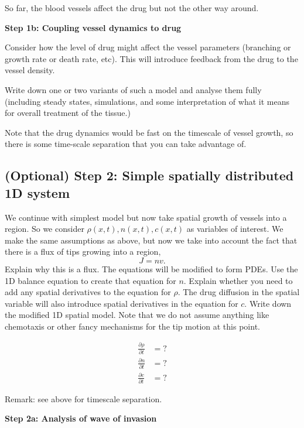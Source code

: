 So far, the blood vessels affect the drug but not the other way around.

\bigskip

\textbf{Step 1b: Coupling vessel dynamics to drug}

Consider how the level of drug might affect the vessel parameters (branching or growth rate or death rate, etc). This will introduce feedback from the drug to the vessel density.

Write down one or two variants of such a model and analyse them fully (including steady states, simulations, and some interpretation of what it means for overall treatment of the tissue.)

Note that the drug dynamics would be fast on the timescale of vessel growth, so there is some time-scale separation that you can take advantage of.

\subsection{(Optional) Step 2: Simple spatially distributed 1D system}
We continue with simplest model but now take spatial growth of vessels into a region. So we consider $\rho(x,t), n(x,t), c(x,t)$ as variables of interest.
We make the same assumptions as above, but now we take into account the fact that there is a flux of tips growing into a region,
\[
J=nv.
\]
Explain why this is a flux.
The equations will be modified to form PDEs. Use the 1D balance equation to create that equation for $n$. Explain whether you need to add any spatial derivatives to the equation for $\rho$. The drug diffusion in the spatial variable will also introduce spatial derivatives in the equation for $c$. Write down the modified 1D spatial model. Note that we do not assume anything like chemotaxis or other fancy mechanisms for the tip motion at this point.

\begin{subequations}
	\label{eq:SpatialtModel}
	\begin{align}
		\frac{\partial \rho}{\partial t }&= ?\\
		\frac{\partial n}{\partial t }&= ?\\
		\frac{\partial c}{\partial t }&= ?
	\end{align}
\end{subequations}

Remark: see above for timescale separation.

\textbf{Step 2a: Analysis of wave of invasion}

